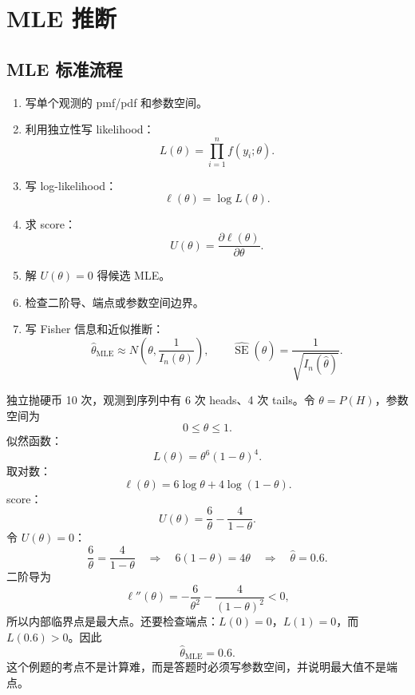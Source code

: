 \documentclass[11pt,a4paper]{article}
\newcommand{\SE}{\operatorname{SE}}
\begin{document}
\section{MLE 推断}

\subsection{MLE 标准流程}

\begin{templatebox}
\begin{enumerate}
  \item 写单个观测的 pmf/pdf 和参数空间。
  \item 利用独立性写 likelihood：
  \[
    L(\theta)=\prod_{i=1}^nf(y_i;\theta).
  \]
  \item 写 log-likelihood：
  \[
    \ell(\theta)=\log L(\theta).
  \]
  \item 求 score：
  \[
    U(\theta)=\frac{\partial\ell(\theta)}{\partial\theta}.
  \]
  \item 解 $U(\theta)=0$ 得候选 MLE。
  \item 检查二阶导、端点或参数空间边界。
  \item 写 Fisher 信息和近似推断：
  \[
    \hat\theta_{\mathrm{MLE}}\approx
    N\left(\theta,\frac1{I_n(\theta)}\right),
    \qquad
    \widehat{\SE}(\hat\theta)=\frac1{\sqrt{I_n(\hat\theta)}}.
  \]
\end{enumerate}
\end{templatebox}

\begin{examplebox}
独立抛硬币 10 次，观测到序列中有 6 次 heads、4 次 tails。令 $\theta=P(H)$，参数空间为
\[
  0\le \theta\le1.
\]
似然函数：
\[
  L(\theta)=\theta^6(1-\theta)^4.
\]
取对数：
\[
  \ell(\theta)=6\log\theta+4\log(1-\theta).
\]
score：
\[
  U(\theta)
  =
  \frac6\theta-\frac4{1-\theta}.
\]
令 $U(\theta)=0$：
\[
  \frac6\theta=\frac4{1-\theta}
  \quad\Rightarrow\quad
  6(1-\theta)=4\theta
  \quad\Rightarrow\quad
  \hat\theta=0.6.
\]
二阶导为
\[
  \ell''(\theta)
  =
  -\frac6{\theta^2}
  -
  \frac4{(1-\theta)^2}<0,
\]
所以内部临界点是最大点。还要检查端点：$L(0)=0$，$L(1)=0$，而 $L(0.6)>0$。因此
\[
  \boxed{\hat\theta_{\mathrm{MLE}}=0.6.}
\]
这个例题的考点不是计算难，而是答题时必须写参数空间，并说明最大值不是端点。
\end{examplebox}
\end{document}
